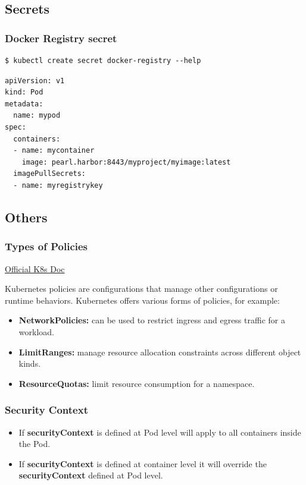 \documentclass{article}
\newenvironment{codetemplate}[1][]{%
  \mybasecolorbox[#1]
  \itshape
}{%
  \endmybasecolorbox
}
\begin{document}
\subsection{Secrets}
\subsubsection{Docker Registry secret}
\begin{codetemplate}{}
\begin{verbatim}
$ kubectl create secret docker-registry --help
\end{verbatim}
\end{codetemplate}
\begin{codetemplate}{}
\begin{verbatim}
apiVersion: v1
kind: Pod
metadata:
  name: mypod
spec:
  containers:
  - name: mycontainer
    image: pearl.harbor:8443/myproject/myimage:latest
  imagePullSecrets:
  - name: myregistrykey
\end{verbatim}
\end{codetemplate}

\subsection{Others}

\subsubsection{Types of Policies}
\href{https://kubernetes.io/docs/concepts/policy/}{Official K8s Doc}

Kubernetes policies are configurations that manage other configurations or runtime behaviors. Kubernetes offers various forms of policies, for example:

\begin{itemize}
    \item \textbf{NetworkPolicies:} can be used to restrict ingress and egress traffic for a workload.
    \item \textbf{LimitRanges:} manage resource allocation constraints across different object kinds.
    \item \textbf{ResourceQuotas:} limit resource consumption for a namespace.
\end{itemize}

\subsubsection{Security Context}
\begin{itemize}
    \item If \textbf{securityContext} is defined at Pod level will apply to all containers inside the Pod.
    \item If \textbf{securityContext} is defined at container level it will override the \textbf{securityContext} defined at Pod level.
\end{itemize}
\end{document}
